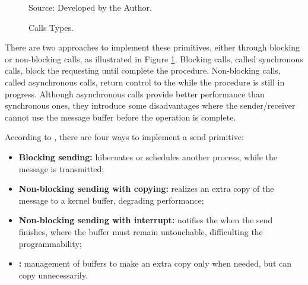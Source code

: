 				\begin{figure}[h]
					\centering
					\caption{Calls Types.}%



					Source: Developed by the Author.

					\label{fig.calls-types}
				\end{figure}

				There are two approaches to implement these primitives, either
				through blocking or non-blocking calls, as illustrated in Figure \ref{fig.calls-types}.
				Blocking calls, called synchronous calls, block the requesting \cpu
				until complete the procedure.
				Non-blocking calls, called asynchronous calls, return control to the
				\cpu while the procedure is still in progress.
				Although asynchronous calls provide better performance than
				synchronous ones, they introduce some disadvantages where the sender/receiver
				cannot use the message buffer before the operation is complete.

				According to , there are four ways to implement a send primitive:
				\begin{itemize}
					\item \textbf{Blocking sending:} \cpu hibernates or schedules another
						process, while the message is transmitted;
					\item \textbf{Non-blocking sending with copying:} realizes an extra copy of
						the message to a kernel buffer, degrading performance;
					\item \textbf{Non-blocking sending with interrupt:} notifies the \cpu
						when the send finishes, where the buffer must remain untouchable,
						difficulting the programmability;
					\item \textbf{\cow:} management of buffers to make an extra copy only
						when needed, but can copy unnecessarily.
				\end{itemize}

